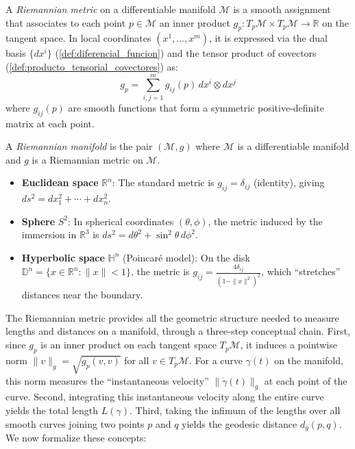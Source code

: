 \begin{definition}\label{def:metrica_riemanniana}
A \textit{Riemannian metric} on a differentiable manifold $\mathcal{M}$ is a smooth assignment that associates to each point $p \in \mathcal{M}$ an inner product $g_p: T_p\mathcal{M} \times T_p\mathcal{M} \to \mathbb{R}$ on the tangent space. In local coordinates $(x^1, \ldots, x^m)$, it is expressed via the dual basis $\{dx^i\}$ (\autoref{def:diferencial_funcion}) and the tensor product of covectors (\autoref{def:producto_tensorial_covectores}) as:
\[
g_p = \sum_{i,j=1}^m g_{ij}(p) \, dx^i \otimes dx^j
\]
where $g_{ij}(p)$ are smooth functions that form a symmetric positive-definite matrix at each point.
\end{definition}

\begin{definition}\label{def:variedad_riemanniana}
A \textit{Riemannian manifold} is the pair $(\mathcal{M}, g)$ where $\mathcal{M}$ is a differentiable manifold and $g$ is a Riemannian metric on $\mathcal{M}$.
\end{definition}

\begin{example}\label{ex:metricas_variedades}
\leavevmode
\begin{itemize}
	\item \textbf{Euclidean space} $\mathbb{R}^n$: The standard metric is $g_{ij} = \delta_{ij}$ (identity), giving $ds^2 = dx_1^2 + \cdots + dx_n^2$.

	\item \textbf{Sphere} $S^2$: In spherical coordinates $(\theta, \phi)$, the metric induced by the immersion in $\mathbb{R}^3$ is $ds^2 = d\theta^2 + \sin^2\theta \, d\phi^2$.

	\item \textbf{Hyperbolic space} $\mathbb{H}^n$ (Poincaré model): On the disk $\mathbb{D}^n = \{x \in \mathbb{R}^n : \|x\| < 1\}$, the metric is $g_{ij} = \frac{4\delta_{ij}}{(1-\|x\|^2)^2}$, which ``stretches'' distances near the boundary.
\end{itemize}
\end{example}

The Riemannian metric provides all the geometric structure needed to measure lengths and distances on a manifold, through a three-step conceptual chain. First, since $g_p$ is an inner product on each tangent space $T_p\mathcal{M}$, it induces a pointwise norm $\|v\|_g = \sqrt{g_p(v,v)}$ for all $v \in T_p\mathcal{M}$. For a curve $\gamma(t)$ on the manifold, this norm measures the ``instantaneous velocity'' $\|\dot\gamma(t)\|_g$ at each point of the curve. Second, integrating this instantaneous velocity along the entire curve yields the total length $L(\gamma)$. Third, taking the infimum of the lengths over all smooth curves joining two points $p$ and $q$ yields the geodesic distance $d_g(p,q)$. We now formalize these concepts:

